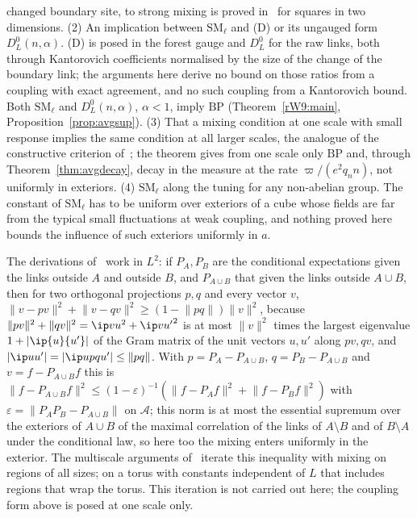 \begin{remark}
changed boundary site, to strong mixing is proved in~\cite{MOS94} for
squares in two dimensions. (2) An implication between $\mathrm{SM}_\ell$ and
(D) or its ungauged form $D^0_L(n,\alpha)$. (D) is posed in the forest
gauge and $D^0_L$ for the raw links, both through Kantorovich coefficients
normalised by the size of the change of the boundary link; the arguments
here derive no bound on those ratios from a coupling with exact agreement,
and no such coupling from a Kantorovich bound. Both $\mathrm{SM}_\ell$ and
$D^0_L(n,\alpha)$, $\alpha<1$, imply $\mathrm{BP}$ (Theorem~\ref{rW9:main},
Proposition~\ref{prop:avgsup}). (3) That a mixing condition at one scale with
small response implies the same condition at all larger scales, the
analogue of the constructive criterion of~\cite{DS85}; the theorem gives
from one scale only $\mathrm{BP}$ and, through Theorem~\ref{thm:avgdecay},
decay in the measure at the rate $\varpi/(e^2q_nn)$, not uniformly in
exteriors. (4) $\mathrm{SM}_\ell$ along the tuning for any non-abelian group.
The constant of $\mathrm{SM}_\ell$ has to be uniform over exteriors of a cube
whose fields are far from the typical small fluctuations at weak coupling,
and nothing proved here bounds the influence of such exteriors uniformly in
$a$.
\end{remark}

\begin{remark}\label{rW9:ltwo}
The derivations of~\cite{MO94b,Ces01,BCC02} work in $L^2$: if $P_A,P_B$ are
the conditional expectations given the links outside $A$ and outside $B$,
and $P_{A\cup B}$ that given the links outside $A\cup B$, then for two
orthogonal projections $p,q$ and every vector $v$, $\lVert v-pv\rVert^2+\lVert
v-qv\rVert^2\ge(1-\lVert pq\rVert)\lVert v\rVert^2$, because $\lVert pv\rVert^2+
\lVert qv\rVert^2=\ip vu^2+\ip v{u'}^2$ is at most $\lVert v\rVert^2$ times the
largest eigenvalue $1+\lvert\ip{u}{u'}\rvert$ of the Gram matrix of the unit
vectors $u,u'$ along $pv,qv$, and $\lvert\ip
u{u'}\rvert=\lvert\ip u{pqu'}\rvert\le\lVert pq\rVert$. With $p=P_A-P_{A\cup B}$,
$q=P_B-P_{A\cup B}$ and $v=f-P_{A\cup B}f$ this is $\lVert f-P_{A\cup B}f
\rVert^2\le(1-\varepsilon)^{-1}(\lVert f-P_Af\rVert^2+\lVert f-P_Bf\rVert^2)$
with $\varepsilon=\lVert P_AP_B-P_{A\cup B}\rVert$ on $\mathcal A$; this
norm is at most the essential supremum over the exteriors of $A\cup B$ of the
maximal correlation of the links of $A\setminus B$ and of $B\setminus A$
under the conditional law, so here too the mixing enters uniformly in the
exterior.
The multiscale arguments of~\cite{MO94b,Ces01} iterate this inequality
with mixing on regions of all sizes; on a torus with constants independent
of $L$ that includes regions that wrap the torus. This iteration is not
carried out here; the coupling form above is posed at one scale only.
\end{remark}

